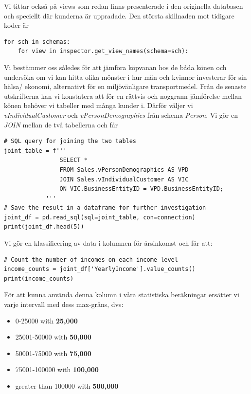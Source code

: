 \documentclass[]{article}
\begin{document}
Vi tittar också på views som redan finns presenterade i den originella databasen och speciellt där kunderna är uppradade. Den största skillnaden mot tidigare koder är
\begin{lstlisting}
for sch in schemas:
    for view in inspector.get_view_names(schema=sch):
\end{lstlisting}
Vi bestämmer oss således för att jämföra köpvanan hos de båda könen och undersöka om vi kan hitta olika mönster i hur män och kvinnor investerar för sin hälsa/ ekonomi, alternativt för en miljövänligare transportmedel. Från de senaste utskrifterna kan vi konstatera att för en rättvis och noggrann jämförelse mellan könen behöver vi tabeller med många kunder i. Därför väljer vi \emph{vIndividualCustomer} och \emph{vPersonDemographics} från schema \emph{Person}. Vi gör en \emph{JOIN} mellan de två tabellerna och får
\begin{lstlisting}
# SQL query for joining the two tables
joint_table = f'''
                SELECT *
                FROM Sales.vPersonDemographics AS VPD
                JOIN Sales.vIndividualCustomer AS VIC
                ON VIC.BusinessEntityID = VPD.BusinessEntityID;
            '''
# Save the result in a dataframe for further investigation
joint_df = pd.read_sql(sql=joint_table, con=connection)
print(joint_df.head(5))
\end{lstlisting}
Vi gör en klassificering av data i kolumnen för årsinkomst och får att:
\begin{lstlisting}
# Count the number of incomes on each income level
income_counts = joint_df['YearlyIncome'].value_counts()
print(income_counts)
\end{lstlisting}
För att kunna använda denna kolumn i våra statistiska beräkningar ersätter vi varje intervall med dess max-gräns, dvs:
\begin{itemize}[topsep=10pt, partopsep=0pt, itemsep=0.2em, parsep=0pt]
	\item[] 0-25000 with \textbf{25,000}
	\item[] 25001-50000 with \textbf{50,000}
	\item[] 50001-75000 with \textbf{75,000}
	\item[] 75001-100000 with \textbf{100,000}
	\item[] greater than 100000 with \textbf{500,000}
\end{itemize}
\end{document}
